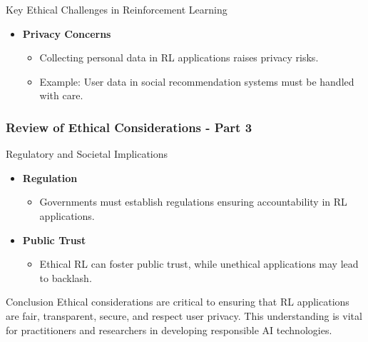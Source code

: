 \documentclass{beamer}
\begin{document}
\begin{frame}[fragile]
\begin{block}{Key Ethical Challenges in Reinforcement Learning}
\begin{itemize}
            \item \textbf{Privacy Concerns}
                \begin{itemize}
                    \item Collecting personal data in RL applications raises privacy risks.
                    \item Example: User data in social recommendation systems must be handled with care.
                \end{itemize}
        \end{itemize}
    \end{block}
\end{frame}

\begin{frame}[fragile]
    \frametitle{Review of Ethical Considerations - Part 3}
    \begin{block}{Regulatory and Societal Implications}
        \begin{itemize}
            \item \textbf{Regulation}
                \begin{itemize}
                    \item Governments must establish regulations ensuring accountability in RL applications.
                \end{itemize}
                
            \item \textbf{Public Trust}
                \begin{itemize}
                    \item Ethical RL can foster public trust, while unethical applications may lead to backlash.
                \end{itemize}
        \end{itemize}
    \end{block}

    \begin{block}{Conclusion}
        Ethical considerations are critical to ensuring that RL applications are fair, transparent, secure, and respect user privacy. This understanding is vital for practitioners and researchers in developing responsible AI technologies.
    \end{block}
\end{frame}
\end{document}
